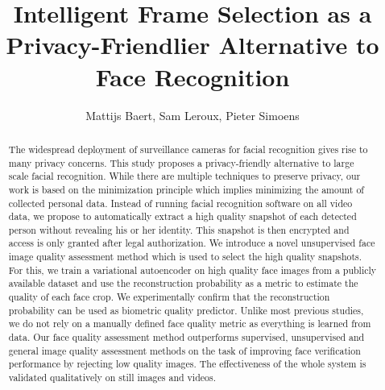 \documentclass[letterpaper]{article} %
\title{Intelligent Frame Selection as a  Privacy-Friendlier Alternative to Face Recognition
}
\author{
Mattijs Baert,
Sam Leroux,
Pieter Simoens
\\
}
\begin{document}
\maketitle

\begin{abstract}
The widespread deployment of surveillance cameras for facial recognition gives rise to many privacy concerns. This study proposes a privacy-friendly alternative to large scale facial recognition. While there are multiple techniques to preserve privacy, our work is based on the minimization principle which implies minimizing the amount of collected personal data. Instead of running facial recognition software on all video data, we propose to automatically extract a high quality snapshot of each detected person without revealing his or her identity. This snapshot is then encrypted and access is only granted after legal authorization. We introduce a novel unsupervised face image quality assessment method which is used to select the high quality snapshots. For this, we train a variational autoencoder on high quality face images from a publicly available dataset and use the reconstruction probability as a metric to estimate the quality of each face crop. We experimentally  confirm that the reconstruction probability can be used as biometric quality predictor. Unlike most previous studies, we do not rely on a manually defined face quality metric as everything is learned from data. Our face quality assessment method outperforms supervised, unsupervised and general image quality assessment methods on the task of improving face verification performance by rejecting low quality images. The effectiveness of the whole system is validated qualitatively on still images and videos.
\end{abstract}
\end{document}
